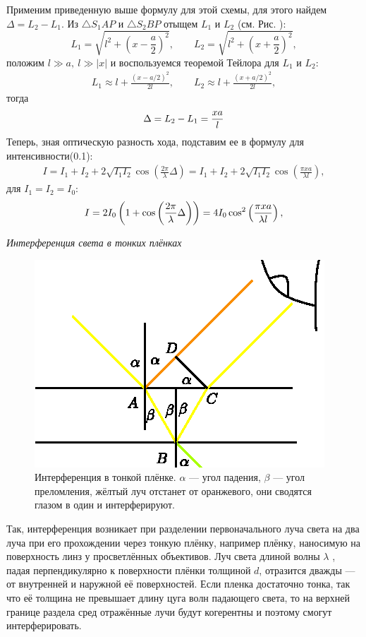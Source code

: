 \documentclass[__main__.tex]{subfiles}
\begin{document}
Применим приведенную выше формулу для этой схемы, для этого найдем $\Delta = L_2 - L_1$. Из
$\triangle S_1AP$ и $\triangle S_2BP$ отыщем $L_1$ и $L_2$ (см. Рис. ):
$$
L_1 = \sqrt{l^2 + \left(x-\frac{a}{2}\right)^2}, \qquad
L_2 = \sqrt{l^2 + \left(x+\frac{a}{2}\right)^2},
$$
положим $l \gg a, \ l \gg |x|$ и воспользуемся теоремой Тейлора для $L_1$ и $L_2$:
\begin{gather*}
L_1 \approx l + \frac{\left(x-a/2\right)^2}{2l}, \qquad
L_2 \approx l + \frac{\left(x+a/2\right)^2}{2l},
\end{gather*}
тогда
\begin{gather}
\llabel{o-02-schemediff}
\displaystyle \Delta = L_2 - L_1 = \frac{xa}{l}
\end{gather}
Теперь, зная оптическую разность хода, подставим ее в формулу для интенсивности(0.1):
\begin{gather*}
I = I_1 + I_2 + 2\sqrt{I_1 I_2}\cos\left(\frac{2\pi}{\lambda}\Delta\right) =
I_1 + I_2 + 2\sqrt{I_1 I_2}\cos\left(\frac{\pi x a}{\lambda l}\right),
\end{gather*}
для $I_1 = I_2 = I_0$:
\begin{gather}
\llabel{o-02-intensesch}
I = 2I_0\left(1 + \cos\left(\frac{2\pi}{\lambda}\Delta\right)\right) =
4I_0\cos^2\left(\frac{\pi xa}{\lambda l}\right),
\end{gather}

\textit{Интерференция света в тонких плёнках}\\
\begin{figure}[h]
	\includegraphics[width=1\linewidth]{img/o-05.eps}
	\caption{Интерференция в тонкой плёнке. $\alpha$ — угол падения, $\beta$ — угол преломления, жёлтый луч отстанет от оранжевого, они сводятся глазом в один и интерферируют.}
\end{figure}
Так, интерференция возникает при разделении первоначального луча света на два луча при его прохождении через тонкую плёнку, например плёнку, наносимую на поверхность линз у просветлённых объективов. Луч света длиной волны $\lambda$ , падая перпендикулярно к поверхности плёнки толщиной $d$, отразится дважды — от внутренней и наружной её поверхностей. Если пленка достаточно тонка, так что её толщина не превышает длину цуга волн падающего света, то на верхней границе раздела сред отражённые лучи будут когерентны и поэтому смогут интерферировать.
\end{document}
